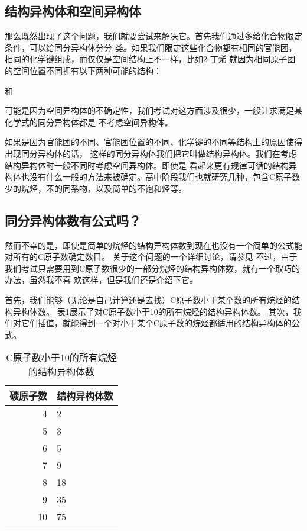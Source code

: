 \subsection{结构异构体和空间异构体}
那么既然出现了这个问题，我们就要尝试来解决它。首先我们通过多给化合物限定条件，可以给同分异构体分分
类。如果我们限定这些化合物都有相同的官能团，相同的化学键组成，而仅仅是空间结构上不一样，比如2-丁烯
就因为相同原子团的空间位置不同拥有以下两种可能的结构：
\begin{center}
和
\end{center}
可能是因为空间异构体的不确定性，我们考试对这方面涉及很少，一般让求满足某化学式的同分异构体都是
不考虑空间异构体。

如果是因为官能团的不同、官能团位置的不同、化学键的不同等结构上的原因使得出现同分异构体的话，
这样的同分异构体我们把它叫做结构异构体。我们在考虑结构异构体时一般不同时考虑空间异构体。即使是
看起来更有规律可循的结构异构体也没有什么一般的方法来被确定。高中阶段我们也就研究几种，包含C原子数
少的烷烃，苯的同系物，以及简单的不饱和烃等。

\subsection{同分异构体数有公式吗？}
然而不幸的是，即使是简单的烷烃的结构异构体数到现在也没有一个简单的公式能对所有的C原子数确定数目。
关于这个问题的一个详细讨论，请参见\cite{NumNCarbonIsomers}
不过，由于我们考试只需要用到C原子数很少的一部分烷烃的结构异构体数，就有一个取巧的办法，虽然我不喜
欢这样，但是我们还是介绍下它。

首先，我们能够（无论是自己计算还是去找）C原子数小于某个数的所有烷烃的结构异构体数。
表\ref{table:NumStructuralIsomers}展示了对C原子数小于10的所有烷烃的结构异构体数。
其次，我们对它们插值，就能得到一个对小于某个C原子数的烷烃都适用的结构异构体的公式。
\begin{table}[!hbtp]
\begin{center}
\begin{tabular}{r|l}
\hline
碳原子数 & 结构异构体数 \\
\hline
4 & 2 \\
\hline
5 & 3 \\
\hline
6 & 5 \\
\hline
7 & 9 \\
\hline
8 & 18 \\
\hline
9 & 35 \\
\hline
10 & 75 \\
\hline
\end{tabular}
\end{center}
\caption{C原子数小于10的所有烷烃的结构异构体数}
\label{table:NumStructuralIsomers}
\end{table}

